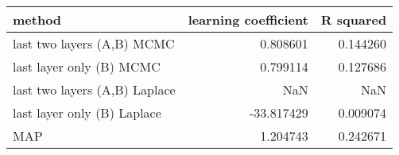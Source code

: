 \begin{tabular}{lrr}
\toprule
                        method &  learning coefficient &  R squared \\
\midrule
    last two layers (A,B) MCMC &              0.808601 &   0.144260 \\
      last layer only (B) MCMC &              0.799114 &   0.127686 \\
 last two layers (A,B) Laplace &                   NaN &        NaN \\
   last layer only (B) Laplace &            -33.817429 &   0.009074 \\
                           MAP &              1.204743 &   0.242671 \\
\bottomrule
\end{tabular}

